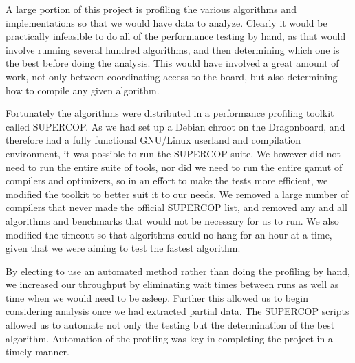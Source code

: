 A large portion of this project is profiling the various algorithms and
implementations so that we would have data to analyze. Clearly it would be
practically infeasible to do all of the performance testing by hand, as that
would involve running several hundred algorithms, and then determining which one
is the best before doing the analysis. This would have involved a great amount
of work, not only between coordinating access to the board, but also
determining how to compile any given algorithm.

Fortunately the algorithms were distributed in a performance profiling toolkit
called SUPERCOP. As we had set up a Debian chroot on the Dragonboard, and
therefore had a fully functional GNU/Linux userland and compilation environment,
it was possible to run the SUPERCOP suite. We however did not need to run the
entire suite of tools, nor did we need to run the entire gamut of compilers and
optimizers, so in an effort to make the tests more efficient, we modified the
toolkit to better suit it to our needs. We removed a large number of compilers
that never made the official SUPERCOP list, and removed any and all algorithms
and benchmarks that would not be necessary for us to run. We also modified the
timeout so that algorithms could no hang for an hour at a time, given that we
were aiming to test the fastest algorithm.

By electing to use an automated method rather than doing the profiling by hand,
we increased our throughput by eliminating wait times between runs as well as
time when we would need to be asleep. Further this allowed us to begin
considering analysis once we had extracted partial data. The SUPERCOP scripts
allowed us to automate not only the testing but the determination of the best
algorithm. Automation of the profiling was key in completing the project in a
timely manner.

